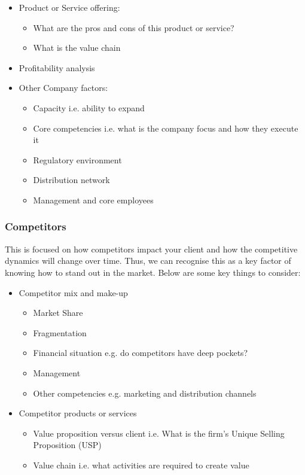 \documentclass[a4paper]{article}
\begin{document}
{\begin{itemize}
	\item Product or Service offering:
		\begin{itemize} 
			\item What are the pros and cons of this product or service?
			\item What is the value chain
		\end{itemize}
	\item Profitability analysis
	\item Other Company factors:
		\begin{itemize}
			\item Capacity i.e. ability to expand
			\item Core competencies i.e. what is the company focus and how they execute it
			\item Regulatory environment
			\item Distribution network
			\item Management and core employees
		\end{itemize}
\end{itemize}

\subsubsection{Competitors}
This is focused on how competitors impact your client and how the competitive dynamics will change over time. Thus, we can recognise this as a key factor of knowing how to stand out in the market. Below are some key things to consider:

\begin{itemize}
	\item Competitor mix and make-up
		\begin{itemize}
			\item Market Share
			\item Fragmentation
			\item Financial situation e.g. do competitors have deep pockets?
			\item Management
			\item Other competencies e.g. marketing and distribution channels
		\end{itemize}
	\item Competitor products or services
		\begin{itemize}
			\item Value proposition versus client i.e. What is the firm's Unique Selling Proposition (USP)
			\item Value chain i.e. what activities are required to create value
		\end{itemize}
\end{itemize}

}
\end{document}
